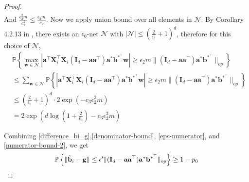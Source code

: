 \documentclass{article}
\theoremstyle{plain}
\theoremstyle{definition}
\theoremstyle{remark}
\begin{document}
\begin{proof}
\begin{align}
\end{align}
And $\frac{\epsilon_2^2 m}{c_2^2} \leq \frac{\epsilon_2 m }{c_2}$. Now we apply union bound over all elements in $\mathcal N$. By Corollary 4.2.13 in \cite{vershynin2018high}, there exists an $\epsilon_0$-net $\mathcal N$ with $|\mathcal N| \le (\frac{2}{\epsilon_0} +1)^d$, therefore for this choice of $\mathcal N$,                                               
\begin{align}
    &\mathbb{P} \left\{ \max_{\mathbf w \in \mathcal N}\left| \mathbf{a}^\top \mathbf{X}_i^\top \mathbf{X}_i (\mathbf{I}_d - \mathbf{a}\mathbf{a}^\top)\mathbf{a}^*\mathbf{b}^{*^\top}\mathbf{w} \right|  \geq \epsilon_2 m \lVert (\mathbf{I}_d - \mathbf{a}\mathbf{a}^\top ) \mathbf{a}^*\mathbf{b}^{*^\top}\rVert_{op}\right\}\\
    &\leq \sum_{\mathbf w \in \mathcal N}\mathbb{P} \left\{ \left| \mathbf{a}^\top \mathbf{X}_i^\top \mathbf{X}_i (\mathbf{I}_d - \mathbf{a}\mathbf{a}^\top)\mathbf{a}^*\mathbf{b}^{*^\top}\mathbf{w} \right|  \geq \epsilon_2 m \lVert (\mathbf{I}_d - \mathbf{a}\mathbf{a}^\top ) \mathbf{a}^*\mathbf{b}^{*^\top}\rVert_{op}\right\}\\
    &\leq \left(\frac{2}{\epsilon_0} +1\right)^d\cdot 2\exp{(-c_3 \epsilon_2^2 m )}\\
    &= 2\exp{(d\log(1+{\textstyle\frac{2}{\epsilon_0}})-c_3 \epsilon_2^2 m )}\label{numerator-bound-2}
\end{align}                                                                        


Combining \eqref{difference_bi_g},\eqref{denominator-bound}, \eqref{eps-numerator}, and \eqref{numerator-bound-2}, we get
\begin{align}
     \mathbb{P} \left\{\lVert \Tilde{\mathbf{b}}_i-\mathbf{g}\rVert \le \epsilon' \|(\mathbf{I}_d - \mathbf{a}\mathbf{a}^\top ) \mathbf{a}^*\mathbf{b}^{*^\top}\|_{op} \right\} \geq 1-  p_0\label{difference_bi_g_bound}
\end{align}


\end{proof}
\end{document}
